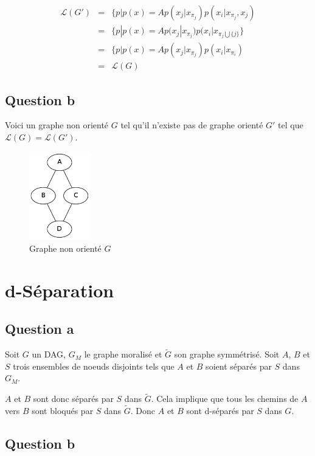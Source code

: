 \documentclass{article}
\begin{document}
\begin{align}
\mathcal{L}(G') & = & \{ p | p(x) = A p(x_j | x_{\pi_j}) p(x_i | x_{\pi_j}, x_j) \\
	        & = & \{ p | p(x) = A p(x_j | x_{\pi_j}) p(x_i | x_{\pi_j \bigcup \{j\}} \} \\
		& = & \{ p | p(x) = A p(x_j | x_{\pi_j}) p(x_i | x_{\pi_i}) \\
		& = & \mathcal{L}(G)
\end{align}


\subsection{Question b}
Voici un graphe non orienté $G$ tel qu'il n'existe pas de graphe orienté $G'$ tel que $\mathcal{L}(G) = \mathcal{L}(G')$.

\begin{figure}[h]
\caption{Graphe non orienté $G$}
\includegraphics[width=100px]{Ia.png}
\end{figure}

\section{d-Séparation}

\subsection{Question a}

Soit $G$ un DAG, $G_M$ le graphe moralisé et $\tilde{G}$ son graphe symmétrisé. Soit
$A$, $B$ et $S$ trois ensembles de noeuds disjoints tels que $A$ et $B$ soient
séparés par $S$ dans $G_M$.

$A$ et $B$ sont donc séparés par $S$ dans $\tilde{G}$. Cela implique que tous
les chemins de $A$ vers $B$ sont bloqués par $S$ dans $\tilde{G}$. Donc $A$ et
$B$ sont d-séparés par $S$ dans $G$.


\subsection{Question b}
\end{document}
